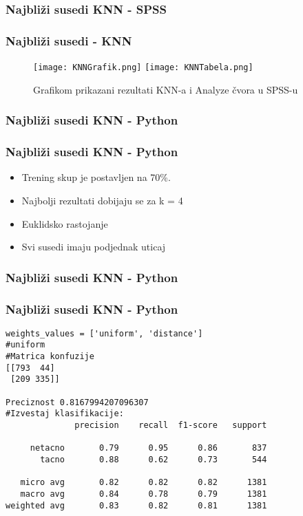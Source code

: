 \documentclass{beamer}
\begin{document}
\subsubsection*{Najbliži susedi KNN - SPSS}
\begin{frame}[fragile]
\frametitle{Najbliži susedi - KNN}
\begin{figure}[ht!]
	\centering
    \texttt{[image: KNNGrafik.png]}
    \texttt{[image: KNNTabela.png]}
    \caption{Grafikom prikazani rezultati KNN-a i Analyze čvora u SPSS-u}
    \label{fig:KNNTabela}
\end{figure}  
\end{frame}

\subsubsection*{Najbliži susedi KNN - Python}
\begin{frame}[fragile]
\frametitle{Najbliži susedi KNN - Python}
\begin{itemize}
\item Trening skup je postavljen na 70\%. 
\item Najbolji rezultati dobijaju se za k = 4
\item Euklidsko rastojanje 
\item Svi susedi imaju podjednak uticaj
\end{itemize}
\end{frame}

\subsubsection*{Najbliži susedi KNN - Python}
\begin{frame}[fragile]
\frametitle{Najbliži susedi KNN - Python}

\begin{lstlisting}
weights_values = ['uniform', 'distance']
#uniform
#Matrica konfuzije
[[793  44]
 [209 335]]

Preciznost 0.8167994207096307
#Izvestaj klasifikacije:
              precision    recall  f1-score   support

     netacno       0.79      0.95      0.86       837
       tacno       0.88      0.62      0.73       544

   micro avg       0.82      0.82      0.82      1381
   macro avg       0.84      0.78      0.79      1381
weighted avg       0.83      0.82      0.81      1381
\end{lstlisting} 

\end{frame}
\end{document}
